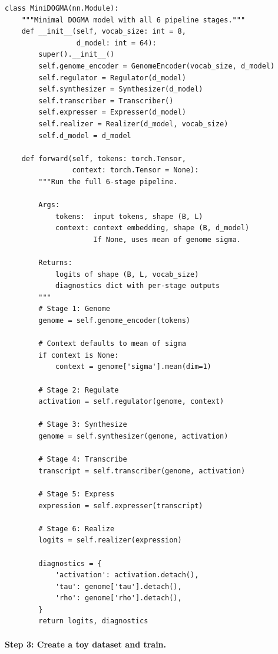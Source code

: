 \begin{lstlisting}[style=dogmapython, caption={Lab 6: Complete DOGMA model.}]
class MiniDOGMA(nn.Module):
    """Minimal DOGMA model with all 6 pipeline stages."""
    def __init__(self, vocab_size: int = 8,
                 d_model: int = 64):
        super().__init__()
        self.genome_encoder = GenomeEncoder(vocab_size, d_model)
        self.regulator = Regulator(d_model)
        self.synthesizer = Synthesizer(d_model)
        self.transcriber = Transcriber()
        self.expresser = Expresser(d_model)
        self.realizer = Realizer(d_model, vocab_size)
        self.d_model = d_model

    def forward(self, tokens: torch.Tensor,
                context: torch.Tensor = None):
        """Run the full 6-stage pipeline.

        Args:
            tokens:  input tokens, shape (B, L)
            context: context embedding, shape (B, d_model)
                     If None, uses mean of genome sigma.

        Returns:
            logits of shape (B, L, vocab_size)
            diagnostics dict with per-stage outputs
        """
        # Stage 1: Genome
        genome = self.genome_encoder(tokens)

        # Context defaults to mean of sigma
        if context is None:
            context = genome['sigma'].mean(dim=1)

        # Stage 2: Regulate
        activation = self.regulator(genome, context)

        # Stage 3: Synthesize
        genome = self.synthesizer(genome, activation)

        # Stage 4: Transcribe
        transcript = self.transcriber(genome, activation)

        # Stage 5: Express
        expression = self.expresser(transcript)

        # Stage 6: Realize
        logits = self.realizer(expression)

        diagnostics = {
            'activation': activation.detach(),
            'tau': genome['tau'].detach(),
            'rho': genome['rho'].detach(),
        }
        return logits, diagnostics
\end{lstlisting}

\paragraph{Step 3: Create a toy dataset and train.}


